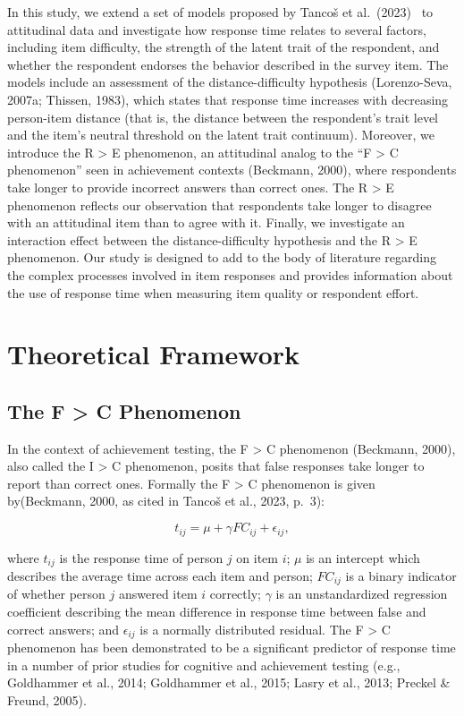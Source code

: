 \documentclass[
]{agujournal2019}
\begin{document}
In this study, we extend a set of models proposed by Tancoš et
al.~(2023) ~to attitudinal data and investigate how response time
relates to several factors, including item difficulty, the strength of
the latent trait of the respondent, and whether the respondent endorses
the behavior described in the survey item. The models include an
assessment of the distance-difficulty hypothesis (Lorenzo-Seva, 2007a;
Thissen, 1983), which states that response time increases with
decreasing person-item distance (that is, the distance between the
respondent's trait level and the item's neutral threshold on the latent
trait continuum). Moreover, we introduce the R \textgreater{} E
phenomenon, an attitudinal analog to the ``F \textgreater{} C
phenomenon'' seen in achievement contexts (Beckmann, 2000), where
respondents take longer to provide incorrect answers than correct ones.
The R \textgreater{} E phenomenon reflects our observation that
respondents take longer to disagree with an attitudinal item than to
agree with it. Finally, we investigate an interaction effect between the
distance-difficulty hypothesis and the R \textgreater{} E phenomenon.
Our study is designed to add to the body of literature regarding the
complex processes involved in item responses and provides information
about the use of response time when measuring item quality or respondent
effort.

\section{Theoretical Framework}\label{theoretical-framework}

\subsection{The F \textgreater{} C Phenomenon}\label{the-f-c-phenomenon}

In the context of achievement testing, the F \textgreater{} C phenomenon
(Beckmann, 2000), also called the I \textgreater{} C phenomenon, posits
that false responses take longer to report than correct ones. Formally
the F \textgreater{} C phenomenon is given by(Beckmann, 2000, as cited
in Tancoš et al., 2023, p.~3):

\[
t_{ij} = \mu + \gamma FC_{ij}+\epsilon_{ij},
\]

where \(t_{ij}\) is the response time of person \(j\) on item \(i\);
\(\mu\) is an intercept which describes the average time across each
item and person; \(FC_{ij}\) is a binary indicator of whether person
\(j\) answered item \(i\) correctly; \(\gamma\) is an unstandardized
regression coefficient describing the mean difference in response time
between false and correct answers; and \(\epsilon_{ij}\) is a normally
distributed residual. The F \textgreater{} C phenomenon has been
demonstrated to be a significant predictor of response time in a number
of prior studies for cognitive and achievement testing (e.g., Goldhammer
et al., 2014; Goldhammer et al., 2015; Lasry et al., 2013; Preckel \&
Freund, 2005).
\end{document}
